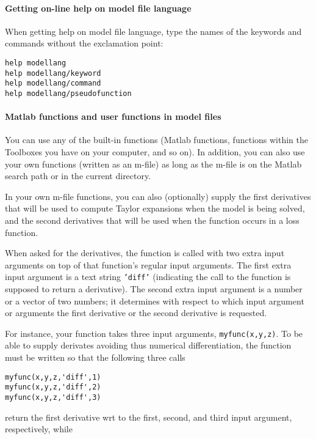\paragraph{Getting on-line help on model file
language}

When getting help on model file language, type the names of the keywords
and commands without the exclamation point:

\begin{verbatim}
help modellang
help modellang/keyword
help modellang/command 
help modellang/pseudofunction
\end{verbatim}

\paragraph{Matlab functions and user functions in model
files}

You can use any of the built-in functions (Matlab functions, functions
within the Toolboxes you have on your computer, and so on). In addition,
you can also use your own functions (written as an m-file) as long as
the m-file is on the Matlab search path or in the current directory.

In your own m-file functions, you can also (optionally) supply the first
derivatives that will be used to compute Taylor expansions when the
model is being solved, and the second derivatives that will be used when
the function occurs in a loss function.

When asked for the derivatives, the function is called with two extra
input arguments on top of that function's regular input arguments. The
first extra input argument is a text string \texttt{'diff'} (indicating
the call to the function is supposed to return a derivative). The second
extra input argument is a number or a vector of two numbers; it
determines with respect to which input argument or arguments the first
derivative or the second derivative is requested.

For instance, your function takes three input arguments,
\texttt{myfunc(x,y,z)}. To be able to supply derivates avoiding thus
numerical differentiation, the function must be written so that the
following three calls

\begin{verbatim}
myfunc(x,y,z,'diff',1)
myfunc(x,y,z,'diff',2)
myfunc(x,y,z,'diff',3)
\end{verbatim}

return the first derivative wrt to the first, second, and third input
argument, respectively, while

